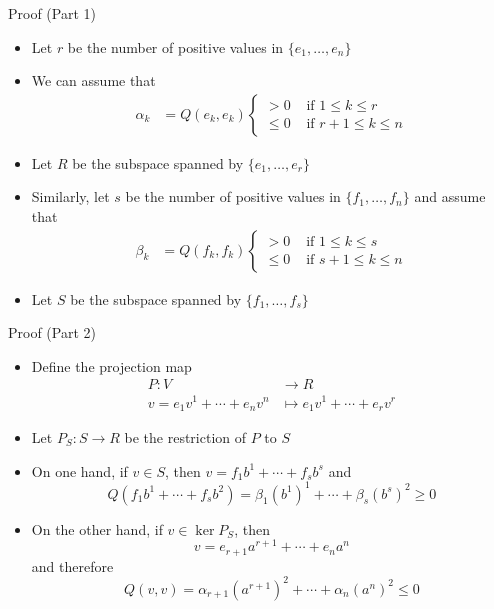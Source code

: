 \documentclass[usenames,dvipsnames,10pt]{beamer}
\begin{document}
\begin{frame}
  {Proof (Part 1)}

  \begin{itemize}
  \item Let $r$ be the number of positive values in $\{e_1, \dots, e_n\}$
  \item We can assume that
    \begin{align*}
      \alpha_k &= Q(e_k,e_k)
                 \begin{cases}
                   > 0 &\text{ if }1 \le k \le r\\
                   \le 0 &\text{ if }r+1 \le k \le n
                 \end{cases}
    \end{align*}
  \item Let $R$ be the subspace spanned by $\{e_1,\dots, e_{r}\}$
  \item Similarly, let $s$ be the number of positive values in $\{f_1, \dots, f_n\}$ and assume that
    \begin{align*}
      \beta_k &= Q(f_k,f_k)
                \begin{cases}
                  > 0 &\text{ if }1 \le k \le s\\
                  \le 0 &\text{ if }s+1 \le k \le n
                \end{cases}
    \end{align*}
  \item Let $S$ be the subspace spanned by $\{f_1, \dots, f_s\}$
  \end{itemize}
\end{frame}

\begin{frame}
  {Proof (Part 2)}

  \begin{itemize}
  \item Define the projection map
    \begin{align*}
      P: V &\rightarrow R\\
      v=e_1v^1+\cdots+e_nv^n &\mapsto e_1v^1+\cdots+e_{r}v^{r}
    \end{align*}
  \item Let $P_S: S \rightarrow R$ be the restriction of $P$ to $S$
  \item On one hand, if $v \in S$, then $v = f_1b^1+\cdots+f_sb^s$ and
    \[ Q(f_1b^1+\cdots+f_sb^2) = \beta_1(b^1)^1+\cdots+\beta_s(b^s)^2 \ge 0 \]
  \item On the other hand, if $v \in \ker P_S$, then
    \[ v = e_{r+1}a^{r+1}+\cdots + e_na^n \]
    and therefore
    \[ Q(v,v) = \alpha_{r+1}(a^{r+1})^2 + \cdots + \alpha_n(a^n)^2 \le 0 \]
  \end{itemize}
\end{frame}
\end{document}
